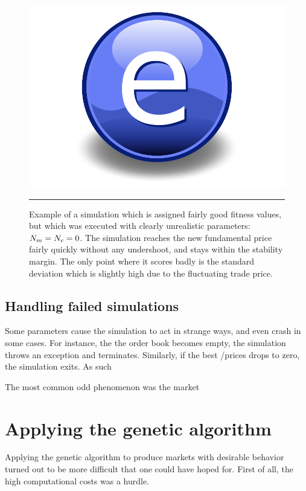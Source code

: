 \begin{figure}[htbp]
	\centering
		\includegraphics{Figures/Electron.pdf}
		\rule{35em}{0.5pt}
	\caption{Example of a simulation which is assigned fairly good fitness values, but which was executed with clearly unrealistic parameters: $N_{m} = N_{c} = 0$. The simulation reaches the new fundamental price fairly quickly without any undershoot, and stays within the stability margin. The only point where it scores badly is the standard deviation which is slightly high due to the fluctuating trade price.}
	\label{fig:no_marketmakers}
\end{figure}


\subsection{Handling failed simulations}\label{section:failed_simulations}


Some parameters cause the simulation to act in strange ways, and even crash in some cases. For instance, the the order book becomes empty, the simulation throws an exception and terminates. Similarly, if the best \bid/\ask prices drops to zero, the simulation exits. As such 

The most common odd phenomenon was the market 


\section{Applying the genetic algorithm}
Applying the genetic algorithm to produce markets with desirable behavior turned out to be more difficult that one could have hoped for. First of all, the high computational costs was a hurdle. 

